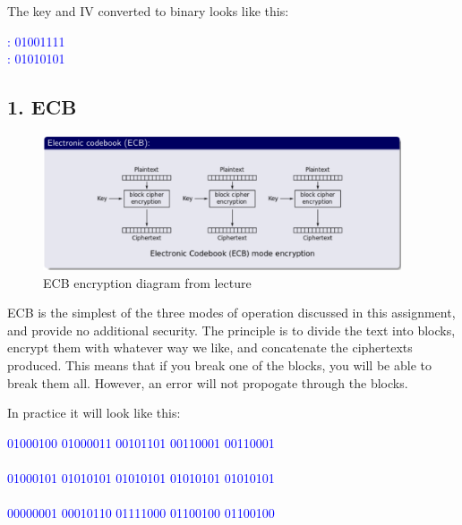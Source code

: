 \documentclass{article}
\begin{document}
The key and IV converted to binary looks like this: 
\begin{tcolorbox}
\begin{center}
\textcolor{blue}{
: 01001111\\
: 01010101}
\end{center}
\end{tcolorbox}



\newpage
\subsection{1. ECB}

\begin{figure}[H]
 \centering
  \includegraphics[width=300pt]{img/ecbLecture.png}
 \caption{ECB encryption diagram from lecture}
 \end{figure}


ECB is the simplest of the three modes of operation discussed in this assignment, and provide no additional security. The principle is to divide the text into blocks, encrypt them with whatever way we like, and concatenate the ciphertexts produced. This means that if you break one of the blocks, you will be able to break them all. However, an error will not propogate through the blocks. 

In practice it will look like this:

\begin{scriptsize}
\begin{tcolorbox}
\begin{center}
\textcolor{blue}{
 01000100 01000011 00101101 00110001 00110001\\
\qquad  {}\qquad  {}\qquad  {}\\
01000101 01010101 01010101 01010101 01010101\\
\makebox[1.5cm]{\textbf{=}}\\
00000001 00010110 01111000 01100100 01100100
}

\end{center}
\end{tcolorbox}
\end{scriptsize}
\end{document}
